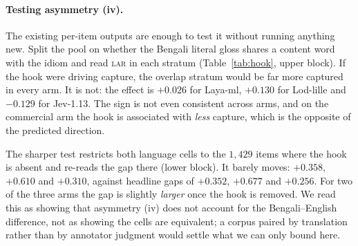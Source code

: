 \documentclass[11pt]{article}
\newcommand{\LAR}{\textsc{lar}}
\begin{document}
\paragraph{Testing asymmetry (iv).} The existing per-item outputs are enough to
test it without running anything new. Split the pool on whether the Bengali literal
gloss shares a content word with the idiom and read \LAR{} in each stratum
(Table~\ref{tab:hook}, upper block). If the hook were driving capture, the
overlap stratum would be far more captured in every arm. It is not: the effect is
$+0.026$ for Laya-ml, $+0.130$ for Lod-lille and $-0.129$ for Jev-1.13. The sign
is not even consistent across arms, and on the commercial arm the hook is
associated with \emph{less} capture, which is the opposite of the predicted
direction.

The sharper test restricts both language cells to the $1{,}429$ items where the
hook is absent and re-reads the gap there (lower block). It barely moves: $+0.358$,
$+0.610$ and $+0.310$, against headline gaps of $+0.352$, $+0.677$ and $+0.256$.
For two of the three arms the gap is slightly \emph{larger} once the hook is
removed. We read this as showing that asymmetry (iv) does not account for the
Bengali--English difference, not as showing the cells are equivalent; a corpus
paired by translation rather than by annotator judgment would settle what we can
only bound here.
\end{document}
